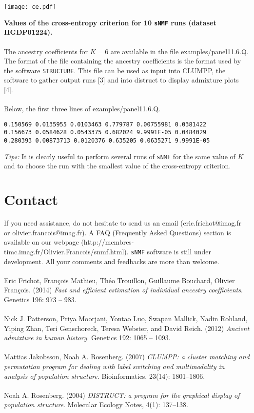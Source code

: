\documentclass[10pt,a4paper]{article}
\begin{document}
\centerline{\texttt{[image: ce.pdf]}}
  {\bf Values of the cross-entropy criterion for 10 {\tt sNMF} runs (dataset HGDP01224).} 
\\
\\

\noindent
The ancestry coefficients for $K=6$ are available in the file examples/panel11.6.Q. The format of the file containing the ancestry coefficients is the format used by the software {\tt STRUCTURE}. This file can be used as input into CLUMPP, the software to gather output runs [3] and into distruct to display admixture plots [4].\\
\\
\noindent
Below, the first three lines of examples/panel11.6.Q.
\begin{center}
\footnotesize
\begin{Verbatim}[frame=single]
0.150569 0.0135955 0.0103463 0.779787 0.00755981 0.0381422
0.156673 0.0584628 0.0543375 0.682024 9.9991E-05 0.0484029
0.280393 0.00873713 0.0120376 0.635205 0.0635271 9.9991E-05
\end{Verbatim}
\end{center}
{\it Tips:} It is clearly useful to perform several runs of {\tt sNMF} for the same value of $K$ and to choose the run with the smallest value of the cross-entropy criterion.



\section{Contact}
If you need assistance, do not hesitate to send us an email (eric.frichot@imag.fr or olivier.francois@imag.fr). 
A FAQ (Frequently Asked Questions) section is available 
on our webpage (http://membres-timc.imag.fr/Olivier.Francois/snmf.html). 
{\tt sNMF} software is still under development. All your comments and feedbacks are more than welcome.\\
\\
\noindent
[1] Eric Frichot, François Mathieu, Théo Trouillon, Guillaume Bouchard, Olivier François. (2014) {\it Fast and efficient estimation of individual ancestry coefficients}. Genetics 196: 973 -- 983.\\ 
\\
\noindent
[2]  Nick J. Patterson, Priya Moorjani, Yontao Luo, Swapan Mallick, Nadin Rohland, Yiping Zhan, Teri
Genschoreck, Teresa Webster, and David Reich. (2012) {\it Ancient admixture in human history}. Genetics
192: 1065 -- 1093.\\
\\
\noindent
[3] Mattias Jakobsson, Noah A. Rosenberg. (2007) {\it CLUMPP: a cluster matching and permutation program for dealing with label switching and multimodality in analysis of population structure}. Bioinformatics, 23(14): 1801--1806.
\\
\\
\noindent
[4] Noah A. Rosenberg. (2004) {\it DISTRUCT: a program for the graphical display of population structure}. Molecular Ecology Notes, 4(1): 137--138.
\end{document}

